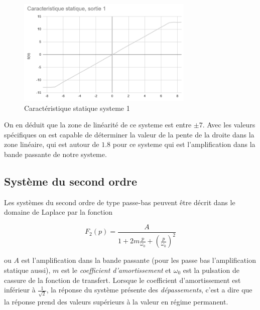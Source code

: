 \documentclass[12pt, a4paper]{report}
\begin{document}
\begin{figure}[H]
    \centering
    \includegraphics[width=0.75\textwidth]{caracteristiquestatiquesys1.png}
    \caption{Caractéristique statique systeme 1}
    \label{fig:carstattiquesys1}
\end{figure}

On en déduit que la zone de linéarité de ce systeme est entre $\pm 7$. Avec les valeurs spécifiques on est capable de déterminer
la valeur de la pente de la droite dans la zone linéaire, qui est autour de $1.8$ pour ce systeme qui est l'amplification dans la bande passante de notre systeme.

\subsection{Système du second ordre}

Les systèmes du second ordre de type passe-bas peuvent être décrit dans le domaine de Laplace par 
la fonction

\[
  F_{2} (p) =   \frac{A}{1 + 2m \frac{p}{\omega_{0}} + \left( \frac{p}{\omega_{0}} \right)^2}
\]

ou $A$ est l'amplification dans la bande passante (pour les passe bas l'amplification statique aussi), 
$m$ est le \textit{coefficient d'amortissement} et $\omega_{0}$ est la pulsation de cassure de la fonction de 
transfert. Lorsque le coefficient d'amortissement est inférieur à $\frac{1}{\sqrt{2}}$, la réponse du système présente
des \textit{dépassements}, c'est a dire que la réponse prend des valeurs supérieurs à la valeur en régime permanent.
\end{document}
